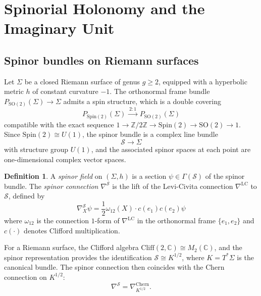 \documentclass[12pt,a4paper]{article}
\theoremstyle{definition}
\newtheorem{definition}[theorem]{Definition}
\theoremstyle{remark}
\newcommand{\CC}{\mathbb{C}}
\newcommand{\ZZ}{\mathbb{Z}}
\newcommand{\SO}{\mathrm{SO}}
\newcommand{\LC}{\mathrm{LC}}
\newcommand{\Chern}{\mathrm{Chern}}
\newcommand{\Spin}{\mathrm{Spin}}
\newcommand{\cS}{\mathcal{S}}
\begin{document}
\section{Spinorial Holonomy and the Imaginary Unit}
\label{sec:holonomy}

\subsection{Spinor bundles on Riemann surfaces}

Let $\Sigma$ be a closed Riemann surface of genus $g \geq 2$, equipped with a hyperbolic metric $h$ of constant curvature $-1$. The orthonormal frame bundle $P_{\SO(2)}(\Sigma) \to \Sigma$ admits a spin structure, which is a double covering
\begin{equation}
P_{\Spin(2)}(\Sigma) \xrightarrow{\; 2:1 \;} P_{\SO(2)}(\Sigma)
\end{equation}
compatible with the exact sequence $1 \to \ZZ/2\ZZ \to \Spin(2) \to \SO(2) \to 1$. Since $\Spin(2) \cong U(1)$, the spinor bundle is a complex line bundle
\begin{equation}
\cS \to \Sigma
\end{equation}
with structure group $U(1)$, and the associated spinor spaces at each point are one-dimensional complex vector spaces.

\begin{definition}
A \emph{spinor field} on $(\Sigma, h)$ is a section $\psi \in \Gamma(\cS)$ of the spinor bundle. The \emph{spinor connection} $\nabla^{\cS}$ is the lift of the Levi-Civita connection $\nabla^{\LC}$ to $\cS$, defined by
\begin{equation}
\nabla^{\cS}_X \psi = \frac{1}{2} \omega_{12}(X) \cdot c(e_1) c(e_2) \psi
\end{equation}
where $\omega_{12}$ is the connection $1$-form of $\nabla^{\LC}$ in the orthonormal frame $\{e_1, e_2\}$ and $c(\cdot)$ denotes Clifford multiplication.
\end{definition}

For a Riemann surface, the Clifford algebra $\mathrm{Cliff}(2, \CC) \cong M_2(\CC)$, and the spinor representation provides the identification $\cS \cong K^{1/2}$, where $K = T^*\Sigma$ is the canonical bundle. The spinor connection then coincides with the Chern connection on $K^{1/2}$:
\begin{equation}
\nabla^{\cS} = \nabla^{\Chern}_{K^{1/2}}.
\end{equation}
\end{document}

